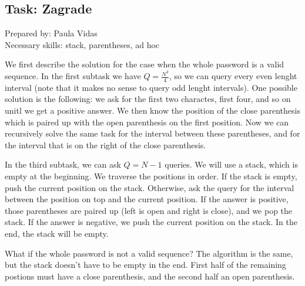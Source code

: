 \subsection*{Task: Zagrade}
\textsf{Prepared by: Paula Vidas}\\
\textsf{Necessary skills: stack, parentheses, ad hoc}

We first describe the solution for the case when the whole password is a valid
sequence. In the first subtask we have $Q = \frac{N^2}{4}$, so we can query
every even lenght interval (note that it makes no sense to query odd lenght
intervals). One possible solution is the following: we ask for the first two
charactes, first four, and so on unitl we get a positive answer. We then know
the position of the close parenthesis which is paired up with the open
parenthesis on the first position. Now we can recursively solve the same task
for the interval between these parentheses, and for the interval that is on the
right of the close parenthesis.

In the third subtask, we can ask $Q = N - 1$ queries. We will use a stack, which
is empty at the beginning. We traverse the positions in order. If the stack is
empty, push the current position on the stack. Otherwise, ask the query for the
interval between the position on top and the current position. If the answer is
positive, those parentheses are paired up (left is open and right
is close), and we pop the stack. If the answer
is negative, we push the current position on the stack. In the end, the stack
will be empty.

What if the whole password is not a valid sequence? The algorithm is the same,
but the stack doesn't have to be empty in the end. First half of
the remaining postions must have a close parenthesis, and the second half an
open parenthesis.
